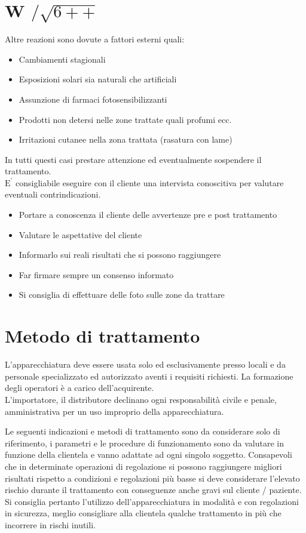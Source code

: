 \documentclass[10pt]{article}
\begin{document}
\section*{W $/ \sqrt{6++}$ }
Altre reazioni sono dovute a fattori esterni quali:

\begin{itemize}
  \item Cambiamenti stagionali
  \item Esposizioni solari sia naturali che artificiali
  \item Assunzione di farmaci fotosensibilizzanti
  \item Prodotti non detersi nelle zone trattate quali profumi ecc.
  \item Irritazioni cutanee nella zona trattata (rasatura con lame)
\end{itemize}

In tutti questi casi prestare attenzione ed eventualmente sospendere il trattamento.\\
$\mathrm{E}^{\prime}$ consigliabile eseguire con il cliente una intervista conoscitiva per valutare eventuali contrindicazioni.

\begin{itemize}
  \item Portare a conoscenza il cliente delle avvertenze pre e post trattamento
  \item Valutare le aspettative del cliente
  \item Informarlo sui reali risultati che si possono raggiungere
  \item Far firmare sempre un consenso informato
  \item Si consiglia di effettuare delle foto sulle zone da trattare
\end{itemize}

\section{Metodo di trattamento}
L'apparecchiatura deve essere usata solo ed esclusivamente presso locali e da personale specializzato ed autorizzato aventi i requisiti richiesti. La formazione degli operatori è a carico dell'acquirente.\\
L'importatore, il distributore declinano ogni responsabilità civile e penale, amministrativa per un uso improprio della apparecchiatura.

Le seguenti indicazioni e metodi di trattamento sono da considerare solo di riferimento, i parametri e le procedure di funzionamento sono da valutare in funzione della clientela e vanno adattate ad ogni singolo soggetto. Consapevoli che in determinate operazioni di regolazione si possono raggiungere migliori risultati rispetto a condizioni e regolazioni più basse si deve considerare l'elevato rischio durante il trattamento con conseguenze anche gravi sul cliente / paziente.\\
Si consiglia pertanto l'utilizzo dell'apparecchiatura in modalità e con regolazioni in sicurezza, meglio consigliare alla clientela qualche trattamento in più che incorrere in rischi inutili.
\end{document}
